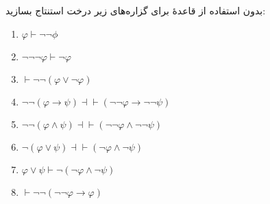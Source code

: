 
بدون استفاده از قاعدهٔ  برای گزاره‌های زیر درخت استنتاج بسازید:
\begin{enumerate}[label=(\alph*)]
    \item $\varphi\vdash\neg\neg\phi$
    \item $\neg\neg\neg\varphi\vdash\neg\varphi$
    \item $\vdash\neg\neg(\varphi\vee\neg\varphi)$
    \item $\neg\neg(\varphi\to\psi)\dashv\vdash(\neg\neg\varphi\to\neg\neg\psi)$
    \item $\neg\neg(\varphi\wedge\psi)\dashv\vdash(\neg\neg\varphi\wedge\neg\neg\psi)$
    \item $\neg(\varphi\vee\psi)\dashv\vdash(\neg\varphi\wedge\neg\psi)$
    \item $\varphi\vee\psi\vdash\neg(\neg\varphi\wedge\neg\psi)$
    \item $\vdash\neg\neg(\neg\neg\varphi\to\varphi)$
\end{enumerate}\quad\vspace{-1cm}
